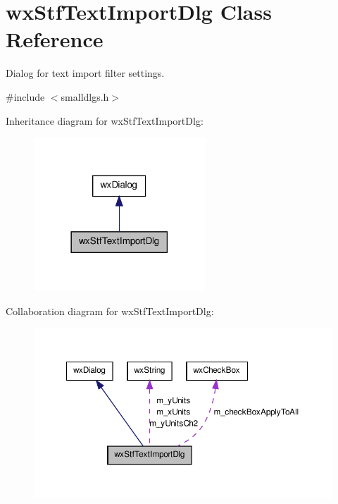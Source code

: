 \hypertarget{classwxStfTextImportDlg}{
\section{wxStfTextImportDlg Class Reference}
\label{classwxStfTextImportDlg}
}


Dialog for text import filter settings.  




{\ttfamily \#include $<$smalldlgs.h$>$}



Inheritance diagram for wxStfTextImportDlg:
\nopagebreak
\begin{figure}[H]
\begin{center}
\leavevmode
\includegraphics[width=182pt]{classwxStfTextImportDlg__inherit__graph}
\end{center}
\end{figure}


Collaboration diagram for wxStfTextImportDlg:
\nopagebreak
\begin{figure}[H]
\begin{center}
\leavevmode
\includegraphics[width=363pt]{classwxStfTextImportDlg__coll__graph}
\end{center}
\end{figure}
